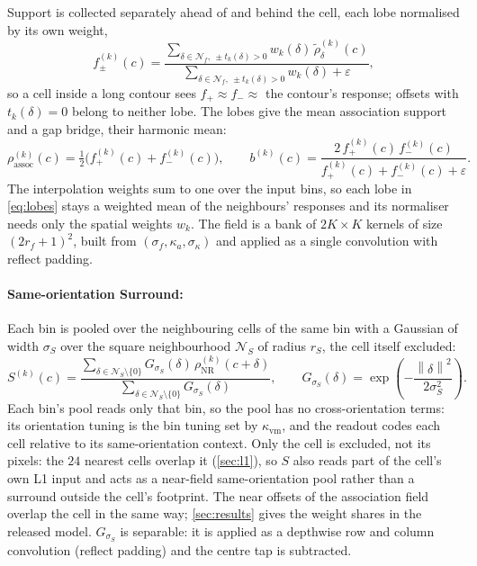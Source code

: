 \documentclass[11pt,a4paper]{article}
\newcommand{\norm}[1]{\left\lVert#1\right\rVert}
\begin{document}
Support is collected separately ahead of and behind the cell, each lobe normalised by its own weight,
\begin{equation}\label{eq:lobes}
  f_{\pm}^{(k)}(c) = \frac{\sum_{\delta \in \mathcal{N}_f,\ \pm t_k(\delta) > 0} w_k(\delta)\, \tilde\rho^{(k)}_{\delta}(c)}
                          {\sum_{\delta \in \mathcal{N}_f,\ \pm t_k(\delta) > 0} w_k(\delta) + \varepsilon},
\end{equation}
so a cell inside a long contour sees $f_+ \approx f_- \approx$ the contour's response; offsets with $t_k(\delta) = 0$ belong to neither lobe. The lobes give the mean association support and a gap bridge, their harmonic mean:
\begin{equation}\label{eq:rho-assoc}
  \rho_{\mathrm{assoc}}^{(k)}(c) = \tfrac{1}{2}\bigl(f_+^{(k)}(c) + f_-^{(k)}(c)\bigr),
  \qquad
  b^{(k)}(c) = \frac{2\, f_+^{(k)}(c)\, f_-^{(k)}(c)}{f_+^{(k)}(c) + f_-^{(k)}(c) + \varepsilon}.
\end{equation}
The interpolation weights sum to one over the input bins, so each lobe in \cref{eq:lobes} stays a weighted mean of the neighbours' responses and its normaliser needs only the spatial weights $w_k$. The field is a bank of $2K \times K$ kernels of size $(2r_f + 1)^2$, built from $(\sigma_f, \kappa_a, \sigma_\kappa)$ and applied as a single convolution with reflect padding.

\paragraph{Same-orientation Surround:}
Each bin is pooled over the neighbouring cells of the same bin with a Gaussian of width $\sigma_S$ over the square neighbourhood $\mathcal{N}_S$ of radius $r_S$, the cell itself excluded:
\begin{equation}\label{eq:S}
  S^{(k)}(c) = \frac{\sum_{\delta \in \mathcal{N}_S \setminus \{0\}} G_{\sigma_S}(\delta)\, \rho_{\mathrm{NR}}^{(k)}(c + \delta)}
                    {\sum_{\delta \in \mathcal{N}_S \setminus \{0\}} G_{\sigma_S}(\delta)},
  \qquad
  G_{\sigma_S}(\delta) = \exp\!\left(-\frac{\norm{\delta}^2}{2\sigma_S^2}\right).
\end{equation}
Each bin's pool reads only that bin, so the pool has no cross-orientation terms: its orientation tuning is the bin tuning set by $\kappa_{\mathrm{vm}}$, and the readout codes each cell relative to its same-orientation context. Only the cell is excluded, not its pixels: the $24$ nearest cells overlap it (\cref{sec:l1}), so $S$ also reads part of the cell's own L1 input and acts as a near-field same-orientation pool rather than a surround outside the cell's footprint. The near offsets of the association field overlap the cell in the same way; \cref{sec:results} gives the weight shares in the released model. $G_{\sigma_S}$ is separable: it is applied as a depthwise row and column convolution (reflect padding) and the centre tap is subtracted.
\end{document}
